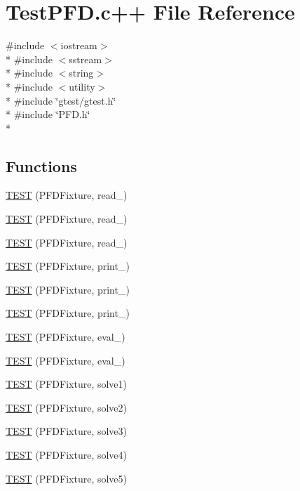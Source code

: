 \hypertarget{TestPFD_8c_09_09}{\section{Test\-P\-F\-D.\-c++ File Reference}
\label{TestPFD_8c_09_09}
}
{\ttfamily \#include $<$iostream$>$}\\*
{\ttfamily \#include $<$sstream$>$}\\*
{\ttfamily \#include $<$string$>$}\\*
{\ttfamily \#include $<$utility$>$}\\*
{\ttfamily \#include \char`\"{}gtest/gtest.\-h\char`\"{}}\\*
{\ttfamily \#include \char`\"{}P\-F\-D.\-h\char`\"{}}\\*
\subsection*{Functions}
\begin{DoxyCompactItemize}
\item 
\hyperlink{TestPFD_8c_09_09_ae2ceeb6270e4c46f9184f444c9a18803}{T\-E\-S\-T} (P\-F\-D\-Fixture, read\-\_)
\item 
\hyperlink{TestPFD_8c_09_09_a7cbb6f2592992b1e2738ac30bd9b3179}{T\-E\-S\-T} (P\-F\-D\-Fixture, read\-\_)
\item 
\hyperlink{TestPFD_8c_09_09_ad4d893008beebcf263d3cc3d02700f98}{T\-E\-S\-T} (P\-F\-D\-Fixture, read\-\_)
\item 
\hyperlink{TestPFD_8c_09_09_aeb73c70e967605680ad0fd952404723a}{T\-E\-S\-T} (P\-F\-D\-Fixture, print\-\_)
\item 
\hyperlink{TestPFD_8c_09_09_a7f9a79749e850d18f5ce2dd840bcd811}{T\-E\-S\-T} (P\-F\-D\-Fixture, print\-\_)
\item 
\hyperlink{TestPFD_8c_09_09_a9e20949b00d611069dcdcdc5d2cb7f0d}{T\-E\-S\-T} (P\-F\-D\-Fixture, print\-\_)
\item 
\hyperlink{TestPFD_8c_09_09_a19c5ff94969bb3a46858e6bf9cbe1776}{T\-E\-S\-T} (P\-F\-D\-Fixture, eval\-\_)
\item 
\hyperlink{TestPFD_8c_09_09_ab68afb0eeb95c024738a36ae7ff8fc18}{T\-E\-S\-T} (P\-F\-D\-Fixture, eval\-\_)
\item 
\hyperlink{TestPFD_8c_09_09_a306e0708d1b40dc0bb6011c54592bb4b}{T\-E\-S\-T} (P\-F\-D\-Fixture, solve1)
\item 
\hyperlink{TestPFD_8c_09_09_a59ac4582d4de7779e8b0bf613da62882}{T\-E\-S\-T} (P\-F\-D\-Fixture, solve2)
\item 
\hyperlink{TestPFD_8c_09_09_a406763214f82c55c0dcdf7bd737bfc37}{T\-E\-S\-T} (P\-F\-D\-Fixture, solve3)
\item 
\hyperlink{TestPFD_8c_09_09_aaa2c8642e29a54997f2c526af11097ad}{T\-E\-S\-T} (P\-F\-D\-Fixture, solve4)
\item 
\hyperlink{TestPFD_8c_09_09_adcd0428f697060e4ecc74f5d600969fb}{T\-E\-S\-T} (P\-F\-D\-Fixture, solve5)
\end{DoxyCompactItemize}


